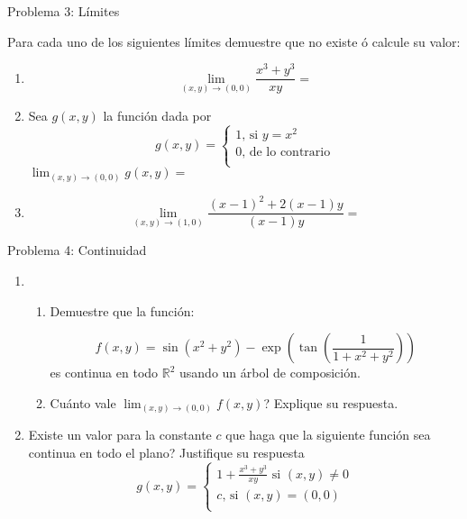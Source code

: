 \documentclass[usepdftitle=false]{beamer}
\begin{document}
\begin{frame}{Problema 3: L\'imites}

Para cada uno de los siguientes l\'imites demuestre que no existe \'o calcule su valor:

\begin{enumerate}
\item \[\lim_{(x,y)\rightarrow (0,0)} \frac{x^3+y^3}{xy}=\]
\item Sea  $g(x,y)$ la funci\'on dada por
\[g(x,y)=\begin{cases}
1\text{, si $y=x^2$}\\
0\text{, de lo contrario}\\
\end{cases}
\]
$\lim_{(x,y)\rightarrow (0,0)} g(x,y)=$

\item \[\lim_{(x,y)\rightarrow (1,0)} \frac{(x-1)^2+2(x-1)y}{(x-1)y}=\]

\end{enumerate}


\end{frame}

\begin{frame}{Problema 4: Continuidad}

\begin{enumerate}
\item{
\begin{enumerate}
\item {Demuestre que la funci\'on:

\[f(x,y)=\sin(x^2+y^2)-\exp\left(\tan\left(\frac{1}{1+x^2+y^2}\right)\right)\]
es continua en todo $\mathbb{R}^2$ usando un \'arbol de composici\'on.}

\item {Cu\'anto vale $\lim_{(x,y)\rightarrow (0,0)}f(x,y)$? Explique su respuesta.}

\end{enumerate}
}
\item Existe un valor para la constante $c$ que haga que la siguiente funci\'on sea continua en todo el plano? Justifique su respuesta
\[g(x,y)=
\begin{cases}
1+\frac{x^3+y^3}{xy}\text{ si $(x,y)\neq 0$}\\
c\text{, si $(x,y)=(0,0)$}\\
\end{cases}
\]
\end{enumerate}
\end{frame}
\end{document}
